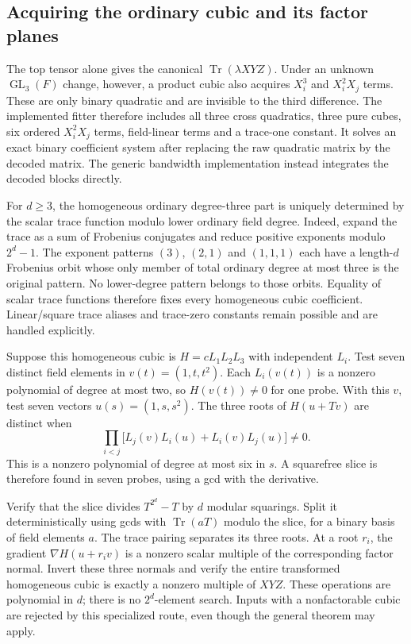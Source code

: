 \documentclass[11pt]{article}
\theoremstyle{remark}\newtheorem{remark}[theorem]{Remark}
\newcommand{\Tr}{\operatorname{Tr}}
\begin{document}
\subsection{Acquiring the ordinary cubic and its factor planes}
The top tensor alone gives the canonical $\Tr(\lambda XYZ)$. Under an unknown $\operatorname{GL}_3(F)$ change, however, a product cubic also acquires $X_i^3$ and $X_i^2X_j$ terms. These are only binary quadratic and are invisible to the third difference. The implemented fitter therefore includes all three cross quadratics, three pure cubes, six ordered $X_i^2X_j$ terms, field-linear terms and a trace-one constant. It solves an exact binary coefficient system after replacing the raw quadratic matrix by the decoded matrix. The generic bandwidth implementation instead integrates the decoded blocks directly.

For $d\ge3$, the homogeneous ordinary degree-three part is uniquely determined by the scalar trace function modulo lower ordinary field degree. Indeed, expand the trace as a sum of Frobenius conjugates and reduce positive exponents modulo $2^d-1$. The exponent patterns $(3)$, $(2,1)$ and $(1,1,1)$ each have a length-$d$ Frobenius orbit whose only member of total ordinary degree at most three is the original pattern. No lower-degree pattern belongs to those orbits. Equality of scalar trace functions therefore fixes every homogeneous cubic coefficient. Linear/square trace aliases and trace-zero constants remain possible and are handled explicitly.

Suppose this homogeneous cubic is $H=cL_1L_2L_3$ with independent $L_i$. Test seven distinct field elements in $v(t)=(1,t,t^2)$. Each $L_i(v(t))$ is a nonzero polynomial of degree at most two, so $H(v(t))\ne0$ for one probe. With this $v$, test seven vectors $u(s)=(1,s,s^2)$. The three roots of $H(u+Tv)$ are distinct when
\[
 \prod_{i<j}\bigl[L_j(v)L_i(u)+L_i(v)L_j(u)\bigr]\ne0.
\]
This is a nonzero polynomial of degree at most six in $s$. A squarefree slice is therefore found in seven probes, using a gcd with the derivative.

Verify that the slice divides $T^{2^d}-T$ by $d$ modular squarings. Split it deterministically using gcds with $\Tr(aT)$ modulo the slice, for a binary basis of field elements $a$. The trace pairing separates its three roots. At a root $r_i$, the gradient $\nabla H(u+r_iv)$ is a nonzero scalar multiple of the corresponding factor normal. Invert these three normals and verify the entire transformed homogeneous cubic is exactly a nonzero multiple of $XYZ$. These operations are polynomial in $d$; there is no $2^d$-element search. Inputs with a nonfactorable cubic are rejected by this specialized route, even though the general theorem may apply.
\end{document}
